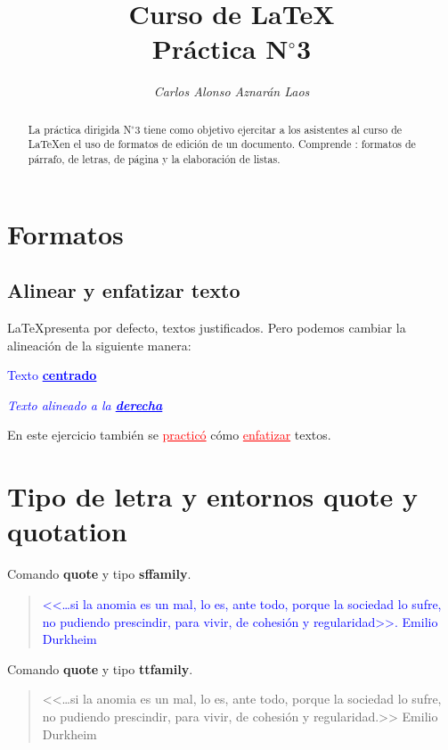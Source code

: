 \documentclass[12pt,a4paper]{article}
\author{\textit{Carlos Alonso Aznarán Laos}}
\title{\textcolor{NavyBlue}{Curso de \LaTeX}\\\textcolor{NavyBlue}{{\normalsize \textbf{Práctica N$ ^{\circ}$3}}}}%
\begin{document}
\maketitle
\begin{abstract}
La práctica dirigida N$ ^{\circ}$3 tiene como objetivo ejercitar a los asistentes al curso de \LaTeX en el uso de formatos de edición de un documento. Comprende : formatos de párrafo, de letras, de página y la elaboración de listas.
\end{abstract}

\section{Formatos}

\subsection{Alinear y enfatizar texto}
\LaTeX presenta por defecto, textos justificados. Pero podemos cambiar la alineación de la siguiente manera:
\begin{center}
\textcolor{Blue}{Texto \textbf{\underline{centrado}}}
\end{center}
\begin{flushright}
\textcolor{Blue}{
\textit{Texto alineado a la \underline{\textbf{derecha}}}}
\end{flushright}
En este ejercicio también se \textcolor{Red}{\underline{practicó}} cómo \textcolor{Red}{\underline{enfatizar}} textos.

\section{Tipo de letra y entornos quote y quotation}

Comando \textbf{quote} y tipo \textbf{sffamily}.
\begin{quote}
\sffamily
\textcolor{Blue}{<<\ldots si la anomia es un mal, lo es, ante todo, porque la sociedad lo sufre, no pudiendo prescindir, para vivir, de cohesión y regularidad>>. Emilio Durkheim}
\end{quote}
Comando \textbf{quote} y tipo \textbf{ttfamily}.
\begin{quote}
\ttfamily
<<\ldots si la anomia es un mal, lo es, ante todo, porque la sociedad lo sufre, no pudiendo prescindir, para vivir, de cohesión y regularidad.>> Emilio Durkheim
\end{quote}
\end{document}
